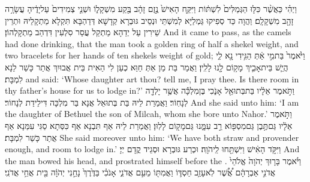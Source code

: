 {וַיְהִ֗י כַּאֲשֶׁ֨ר כִּלּ֤וּ הַגְּמַלִּים֙ לִשְׁתּ֔וֹת וַיִּקַּ֤ח הָאִישׁ֙ נֶ֣זֶם זָהָ֔ב בֶּ֖קַע מִשְׁקָל֑וֹ וּשְׁנֵ֤י צְמִידִים֙ עַל\maqqaf יָדֶ֔יהָ עֲשָׂרָ֥ה זָהָ֖ב מִשְׁקָלָֽם׃}
{וַהֲוָה כַּד סְפִיקוּ גַּמְלַיָּא לְמִשְׁתֵּי וּנְסֵיב גּוּבְרָא קְדָשָׁא דְּדַהְבָּא תִּקְלָא מַתְקָלֵיהּ וּתְרֵין שֵׁירִין עַל יְדַהָא מַתְקַל עֲסַר סִלְעִין דִּדְהַב מַתְקָלְהוֹן׃}
{And it came to pass, as the camels had done drinking, that the man took a golden ring of half a shekel weight, and two bracelets for her hands of ten shekels weight of gold;}{}
{וַיֹּ֙אמֶר֙ בַּת\maqqaf מִ֣י אַ֔תְּ הַגִּ֥ידִי נָ֖א לִ֑י הֲיֵ֧שׁ בֵּית\maqqaf אָבִ֛יךְ מָק֥וֹם לָ֖נוּ לָלִֽין׃}
{וַאֲמַר בַּת מַן אַתְּ חַוַּא כְעַן לִי הַאִית בֵּית אֲבוּיִךְ אֲתַר כָּשַׁר לַנָא לִמְבָּת׃}
{and said: ‘Whose daughter art thou? tell me, I pray thee. Is there room in thy father’s house for us to lodge in?’}{}
{וַתֹּ֣אמֶר אֵלָ֔יו בַּת\maqqaf בְּתוּאֵ֖ל אָנֹ֑כִי בֶּן\maqqaf מִלְכָּ֕ה אֲשֶׁ֥ר יָלְדָ֖ה לְנָחֽוֹר׃}
{וַאֲמַרַת לֵיהּ בַּת בְּתוּאֵל אֲנָא בַּר מִלְכָּה דִּילֵידַת לְנָחוֹר׃}
{And she said unto him: ‘I am the daughter of Bethuel the son of Milcah, whom she bore unto Nahor.’}{}
{וַתֹּ֣אמֶר אֵלָ֔יו גַּם\maqqaf תֶּ֥בֶן גַּם\maqqaf מִסְפּ֖וֹא רַ֣ב עִמָּ֑נוּ גַּם\maqqaf מָק֖וֹם לָלֽוּן׃}
{וַאֲמַרַת לֵיהּ אַף תִּבְנָא אַף כִּסְּתָא סַגִּי עִמַּנָא אַף אֲתַר כָּשַׁר לִמְבָּת׃}
{She said moreover unto him: ‘We have both straw and provender enough, and room to lodge in.’}{}
{וַיִּקֹּ֣ד הָאִ֔ישׁ וַיִּשְׁתַּ֖חוּ לַֽיהֹוָֽה׃}
{וּכְרַע גּוּבְרָא וּסְגֵיד קֳדָם יְיָ׃}
{And the man bowed his head, and prostrated himself before the \lord.}{}
{וַיֹּ֗אמֶר בָּר֤וּךְ יְהֹוָה֙ אֱלֹהֵי֙ אֲדֹנִ֣י אַבְרָהָ֔ם אֲ֠שֶׁ֠ר לֹֽא\maqqaf עָזַ֥ב חַסְדּ֛וֹ וַאֲמִתּ֖וֹ מֵעִ֣ם אֲדֹנִ֑י אָנֹכִ֗י בַּדֶּ֙רֶךְ֙ נָחַ֣נִי יְהֹוָ֔ה בֵּ֖ית אֲחֵ֥י אֲדֹנִֽי׃}

